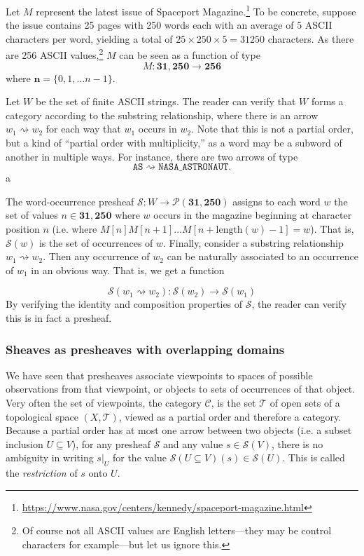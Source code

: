\begin{example}\label{exm:words} Let $M$ represent the latest issue of Spaceport Magazine.\footnote{\url{https://www.nasa.gov/centers/kennedy/spaceport-magazine.html}} To be concrete, suppose the issue contains 25 pages with 250 words each with an average of $5$ ASCII characters per word, yielding a total of $25 \times 250 \times 5 = 31250$ characters. As there are 256 ASCII values,\footnote{Of course not all ASCII values are English letters---they may be control characters for example---but let us ignore this.} $M$ can be seen as a function of type
\[ M : \mathbf{31,250} \to \mathbf{256}\]
where $\mathbf{n} = \{0, 1, \ldots n-1\}$.

Let $W$ be the set of finite ASCII strings. The reader can verify that $W$ forms a category according to the substring relationship, where there is an arrow $w_1 \rightsquigarrow w_2$ for each way that $w_1$ occurs in $w_2$. Note that this is not a partial order, but a kind of ``partial order with multiplicity,'' as a word may be a subword of another in multiple ways. For instance, there are two arrows of type
\[\texttt{AS} \rightsquigarrow \texttt{NASA\_ASTRONAUT}.\]a



The word-occurrence presheaf $\mathcal{S} : W \to \mathcal{P}(\mathbf{31,250})$ assigns to each word $w$ the set of values $n \in \mathbf{31,250}$ where $w$ occurs in the magazine beginning at character position $n$ (i.e. where $M[n] M[n+1] \ldots M[n+\textrm{length}(w)-1] = w$). That is, $\mathcal{S}(w)$ is the set of occurrences of $w$. Finally, consider a substring relationship $w_1 \rightsquigarrow w_2$. Then any occurrence of $w_2$ can be naturally associated to an occurrence of $w_1$ in an obvious way. That is, we get a function

\[\mathcal{S}(w_1 \rightsquigarrow w_2) : \mathcal{S}(w_2) \to \mathcal{S}(w_1)\]
By verifying the identity and composition properties of $\mathcal{S}$, the reader can verify this is in fact a presheaf.
\end{example}

\subsubsection{Sheaves as presheaves with overlapping domains}

We have seen that presheaves associate viewpoints to spaces of possible observations from that viewpoint, or objects to sets of occurrences of that object. Very often the set of viewpoints, the category $\mathcal{C}$, is the set $\mathcal{T}$ of open sets of a topological space $(X, \mathcal{T})$, viewed as a partial order and therefore a category. Because a partial order has at most one arrow between two objects (i.e. a subset inclusion $U \subseteq V$), for any presheaf $\mathcal{S}$ and any value $s \in \mathcal{S}(V)$, there is no ambiguity in writing $s|_U$ for the value $\mathcal{S}(U \subseteq V)(s) \in \mathcal{S}(U)$. This is called the \emph{restriction} of $s$ onto $U$.

